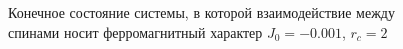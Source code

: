 \documentclass[14pt,a4paper,report]{ncc}
\begin{document}
\begin{figure}[h]
\begin{minipage}[h]{0.49\linewidth}
\end{minipage}
\hfill
\begin{minipage}[h]{0.49\linewidth}
\end{minipage}
\caption{Конечное состояние системы, в которой взаимодействие между спинами носит ферромагнитный характер $J_0=-0.001$, $r_c=2$}
\label{ris:image14}
\end{figure}
\end{document}
